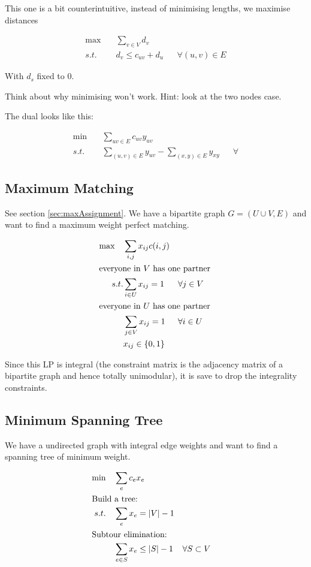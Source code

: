 This one is a bit counterintuitive, instead of minimising lengths, we maximise distances

\begin{align*}
\max \quad & \sum_{v\in V} d_v\\
s.t. \quad & d_v \leq c_{uv} + d_u && \forall (u,v) \in E
\end{align*}

With $d_s$ fixed to 0. 

Think about why minimising won't work. Hint: look at the two nodes case.

The dual looks like this:

\begin{align*}
\min \quad & \sum_{uv\in E} c_{uv} y_{uv}\\
s.t. \quad &  \sum_{(u,v)\in E} y_{uv} - \sum_{(x,y)\in E} y_{xy} && \forall 
\end{align*}

\subsection{Maximum Matching}

See section \ref{sec:maxAssignment}. We have a bipartite graph $G=(U\cup V,E)$ and want to find a maximum weight perfect matching.

\begin{align*}
\max \quad &  \sum_{i,j} x_{ij} c(i,j)\\
\intertext{everyone in $V$ has one partner}
s.t. & \sum_{i\in U} x_{ij}=1 && \forall j\in V \\
\intertext{everyone in $U$ has one partner}
&\sum_{j\in V} x_{ij} = 1 && \forall i\in U\\
&x_{ij}\in \{0,1\}
\end{align*}

Since this LP is integral (the constraint matrix is the adjacency matrix of a bipartite graph and hence totally unimodular), it is save to drop the integrality constraints.

\subsection{Minimum Spanning Tree}

We have a undirected graph with integral edge weights and want to find a spanning tree of minimum weight.

\begin{align*}
\min \quad &\sum_e c_e x_e\\
\intertext{Build a tree:}
s.t. \quad & \sum_e x_e = |V| -1 \\
\intertext{Subtour elimination:}
	& \sum_{e\in S} x_e \leq |S| -1 && \forall S \subset V
\end{align*}

